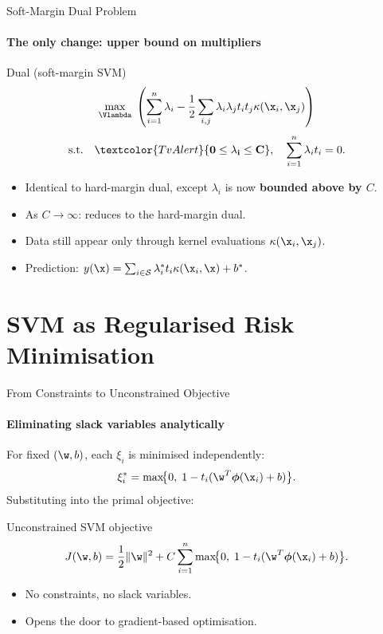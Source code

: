 \begin{frame}{Soft-Margin Dual Problem}
  \framesubtitle{The only change: upper bound on multipliers}
  \begin{block}{Dual (soft-margin SVM)}
    \[
      \max_{\Vlambda} \;\left(\sum_{i=1}^n \lambda_i -
      \frac{1}{2}\sum_{i,j} \lambda_i\lambda_j t_i t_j \kappa(\x_i,\x_j)\right)
    \]
    \[
      \text{s.t.}\quad \textcolor{TvAlert}{\mathbf{0 \le \lambda_i \le C}}, \quad
      \sum_{i=1}^n \lambda_i t_i = 0.
    \]
  \end{block}
  \begin{itemize}
    \item Identical to hard-margin dual, except $\lambda_i$ is now \textbf{bounded above by $C$}.
    \item As $C \to \infty$: reduces to the hard-margin dual.
    \item Data still appear only through \alert{kernel evaluations} $\kappa(\x_i,\x_j)$.
    \item Prediction: $y(\x) = \sum_{i\in\mathcal{S}} \lambda_i^* t_i \kappa(\x_i,\x) + b^*$.
  \end{itemize}
\end{frame}

\section{SVM as Regularised Risk Minimisation}

\begin{frame}{From Constraints to Unconstrained Objective}
  \framesubtitle{Eliminating slack variables analytically}
  For fixed $(\w,b)$, each $\xi_i$ is minimised independently:
  \[
    \xi_i^* = \max\!\bigl\{0,\; 1 - t_i(\w^T\boldsymbol{\phi}(\x_i)+b)\bigr\}.
  \]
  Substituting into the primal objective:
  \begin{block}{Unconstrained SVM objective}
    \[
      J(\w,b) = \frac{1}{2}\|\w\|^2 + C\sum_{i=1}^n
      \max\!\bigl\{0,\; 1 - t_i(\w^T\boldsymbol{\phi}(\x_i)+b)\bigr\}.
    \]
  \end{block}
  \begin{itemize}
    \item No constraints, no slack variables.
    \item Opens the door to \alert{gradient-based optimisation}.
  \end{itemize}
\end{frame}

